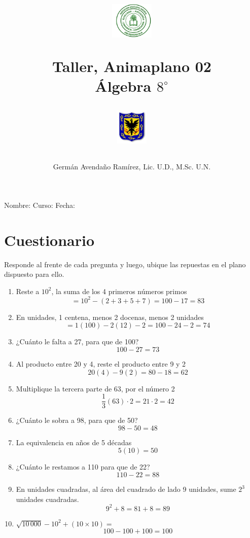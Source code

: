 \documentclass[10pt,twoside]{article}
\author{Germ\'an Avenda\~no Ram\'irez, Lic. U.D., M.Sc. U.N.}
\title{\begin{minipage}{.2\textwidth}
\includegraphics[height=1.75cm]{Images/logo-colegio.png}\end{minipage}
\begin{minipage}{.55\textwidth}
\begin{center}
Taller, Animaplano 02 \\
Álgebra $8^{\circ}$
\end{center}
\end{minipage}\hfill
\begin{minipage}{.2\textwidth}
\includegraphics[height=1.75cm]{Images/logo-sed.png} 
\end{minipage}}
\date{}
\begin{document}
\maketitle
Nombre: \hrulefill Curso: \underline{\hspace*{44pt}} Fecha: \underline{\hspace*{2.5cm}}
\section*{Cuestionario}
Responde al frente de cada pregunta y luego, ubique las repuestas en el plano dispuesto para ello.
\begin{enumerate}
 \item Reste a $10^{2}$, la suma de los 4 primeros números primos \[=10^{2}-(2+3+5+7)=100-17=83\]
 \item En unidades, 1 centena, menos 2 docenas, menos 2 unidades \[=1(100)-2(12)-2=100-24-2=74\]
 \item ¿Cuánto le falta a 27, para que de 100? \[100-27=73\]
 \item Al producto entre 20 y 4, reste el producto entre 9 y 2 \[20(4)-9(2)=80-18=62\]
 \item Multiplique la tercera parte de 63, por el número 2 \[\frac{1}{3}(63)\cdot 2=21\cdot 2=42\]
 \item ¿Cuánto le sobra a 98, para que de 50? \[98-50=48\]
 \item La equivalencia en años de 5 décadas \[5(10)=50\]
 \item ¿Cuánto le restamos a 110 para que de 22? \[110-22=88\]
 \item En unidades cuadradas, al área del cuadrado de lado 9 unidades, sume $2^{3}$ unidades cuadradas. \[9^{2}+8=81+8=89\]
 \item $\sqrt{10\,000}-10^{2}+(10\times10)=$ \[100-100+100=100\]

\end{enumerate}
\end{document}
